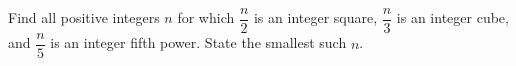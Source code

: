 Find all positive integers $n$ for which $\dfrac{n}{2}$ is an integer square, $\dfrac{n}{3}$ is an integer cube, and $\dfrac{n}{5}$ is an integer fifth power. State the smallest such $n$.
